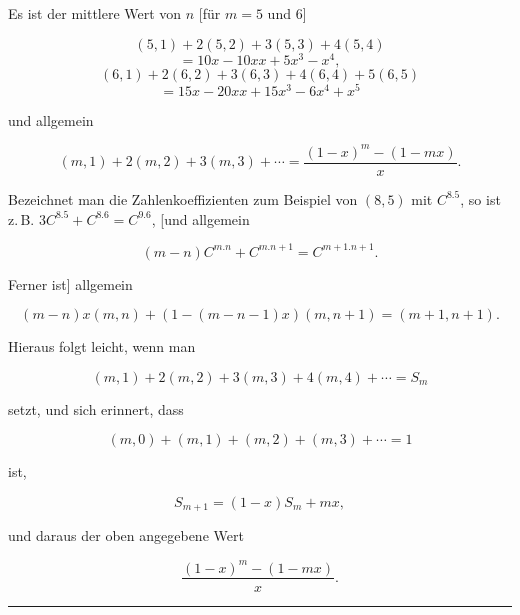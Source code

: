 \clearpage
{}
Es ist der mittlere Wert von $n$ [für $m=5$ und $6$]

\[
(5,1)+2(5,2)+3(5,3)+4(5,4)
\]
\[
= 10x-10xx+5x^3-x^4,
\]
\[
(6,1)+2(6,2)+3(6,3)+4(6,4)+5(6,5)
\]
\[
= 15x-20xx+15x^3-6x^4+x^5
\]

und allgemein

\[
(m,1)+2(m,2)+3(m,3)+\cdots = \frac{(1-x)^m-(1-mx)}{x}.
\]

Bezeichnet man die Zahlenkoeffizienten zum Beispiel von $(8,5)$ mit
$C^{8.5}$, so ist z.\,B. $3C^{8.5}+C^{8.6}=C^{9.6}$,
[und allgemein

\[
(m-n)C^{m.n}+C^{m.n+1}=C^{m+1.n+1}.
\]

Ferner ist] allgemein

\[
(m-n)x(m,n)+(1-(m-n-1)x)(m,n+1)=(m+1,n+1).
\]

Hieraus folgt leicht, wenn man

\[
(m,1)+2(m,2)+3(m,3)+4(m,4)+\cdots = S_m
\]

setzt, und sich erinnert, dass

\[
(m,0)+(m,1)+(m,2)+(m,3)+\cdots = 1
\]

ist,

\[
S_{m+1} = (1-x)S_m+mx,
\]

und daraus der oben angegebene Wert

\[
\frac{(1-x)^m-(1-mx)}{x}.
\]

\bigskip
\hrule
